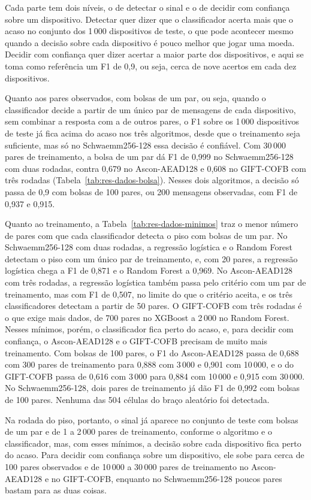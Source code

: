 Cada parte tem dois níveis, o de detectar o sinal e o de decidir com confiança sobre um dispositivo. Detectar quer dizer que o classificador acerta mais que o acaso no conjunto dos 1\,000 dispositivos de teste, o que pode acontecer mesmo quando a decisão sobre cada dispositivo é pouco melhor que jogar uma moeda. Decidir com confiança quer dizer acertar a maior parte dos dispositivos, e aqui se toma como referência um F1 de 0,9, ou seja, cerca de nove acertos em cada dez dispositivos.

Quanto aos pares observados, com bolsas de um par, ou seja, quando o classificador decide a partir de um único par de mensagens de cada dispositivo, sem combinar a resposta com a de outros pares, o F1 sobre os 1\,000 dispositivos de teste já fica acima do acaso nos três algoritmos, desde que o treinamento seja suficiente, mas só no Schwaemm256-128 essa decisão é confiável. Com 30\,000 pares de treinamento, a bolsa de um par dá F1 de 0,999 no Schwaemm256-128 com duas rodadas, contra 0,679 no Ascon-AEAD128 e 0,608 no GIFT-COFB com três rodadas (Tabela~\ref{tab:res-dados-bolsa}). Nesses dois algoritmos, a decisão só passa de 0,9 com bolsas de 100 pares, ou 200 mensagens observadas, com F1 de 0,937 e 0,915.

Quanto ao treinamento, a Tabela~\ref{tab:res-dados-minimos} traz o menor número de pares com que cada classificador detecta o piso com bolsas de um par. No Schwaemm256-128 com duas rodadas, a regressão logística e o Random Forest detectam o piso com um único par de treinamento, e, com 20 pares, a regressão logística chega a F1 de 0,871 e o Random Forest a 0,969. No Ascon-AEAD128 com três rodadas, a regressão logística também passa pelo critério com um par de treinamento, mas com F1 de 0,507, no limite do que o critério aceita, e os três classificadores detectam a partir de 50 pares. O GIFT-COFB com três rodadas é o que exige mais dados, de 700 pares no XGBoost a 2\,000 no Random Forest. Nesses mínimos, porém, o classificador fica perto do acaso, e, para decidir com confiança, o Ascon-AEAD128 e o GIFT-COFB precisam de muito mais treinamento. Com bolsas de 100 pares, o F1 do Ascon-AEAD128 passa de 0,688 com 300 pares de treinamento para 0,888 com 3\,000 e 0,901 com 10\,000, e o do GIFT-COFB passa de 0,616 com 3\,000 para 0,884 com 10\,000 e 0,915 com 30\,000. No Schwaemm256-128, dois pares de treinamento já dão F1 de 0,992 com bolsas de 100 pares. Nenhuma das 504 células do braço aleatório foi detectada.

Na rodada do piso, portanto, o sinal já aparece no conjunto de teste com bolsas de um par e de 1 a 2\,000 pares de treinamento, conforme o algoritmo e o classificador, mas, com esses mínimos, a decisão sobre cada dispositivo fica perto do acaso. Para decidir com confiança sobre um dispositivo, ele sobe para cerca de 100 pares observados e de 10\,000 a 30\,000 pares de treinamento no Ascon-AEAD128 e no GIFT-COFB, enquanto no Schwaemm256-128 poucos pares bastam para as duas coisas.


